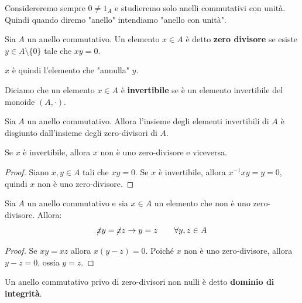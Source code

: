 \documentclass[../main.tex]{subfiles}
\begin{document}
Considereremo sempre $0 \neq 1_A$ e studieremo solo anelli commutativi con unità. Quindi quando diremo "anello" intendiamo "anello con unità".

\begin{definition}
    Sia $A$ un anello commutativo. Un elemento $x \in A$ è detto \textbf{zero divisore} se esiste $y \in A \setminus \{0\}$
    tale che $x y = 0$.

    $x$ è quindi l'elemento che "annulla" $y$.
\end{definition}

\begin{definition}
    Diciamo che un elemento $x \in A$ è \textbf{invertibile} se è un elemento invertibile del monoide $(A, \cdot )$.
\end{definition}

\begin{proposition}
    Sia $A$ un anello commutativo. Allora l'insieme degli elementi invertibili di $A$ è disgiunto dall'insieme degli zero-divisori di $A$.

    Se $x$ è invertibile, allora $x$ non è uno zero-divisore e viceversa.
\end{proposition}

\begin{proof}
    Siano $x,y \in A$ tali che $x y = 0$. Se $x$ è invertibile, allora $x^{-1}xy = y = 0$, quindi $x$ non è uno zero-divisore.
\end{proof}

\begin{proposition}
    Sia $A$ un anello commutativo e sia $x \in A$ un elemento che non è uno zero-divisore. Allora:
    \begin{equation*}
        \cancel{x}y=\cancel{x}z \rightarrow y = z \qquad \forall y,z \in A
    \end{equation*}
\end{proposition}

\begin{proof}
    Se $xy = xz$ allora $x(y - z) = 0 $. Poiché $x$ non è uno zero-divisore, allora $y-z = 0$, ossia $y=z$.
\end{proof}

\begin{definition}
    Un anello commutativo privo di zero-divisori non nulli è detto \textbf{dominio di integrità}.
\end{definition}
\end{document}
